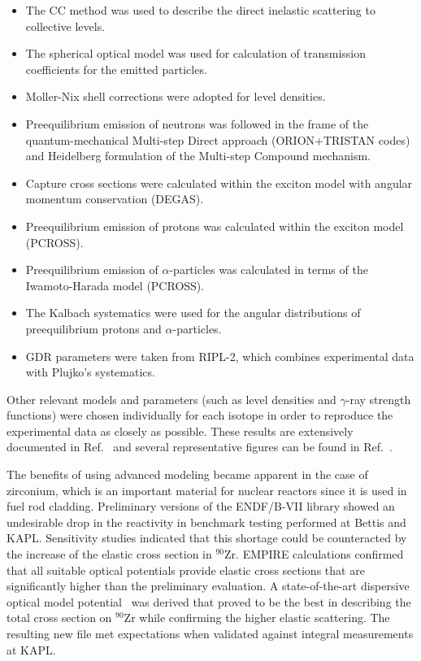\begin{itemize}
\item The CC method was used to describe the direct inelastic scattering to
collective levels.

\item The spherical optical model was used for calculation of transmission
coefficients for the emitted particles.

\item Moller-Nix shell corrections were adopted for level densities.

\item Preequilibrium emission of neutrons was followed in the frame of the
quantum-mechanical Multi-step Direct approach (ORION+TRISTAN codes) and
Heidelberg formulation of the Multi-step Compound mechanism.

\item Capture cross sections were calculated within the exciton model with
angular momentum conservation (DEGAS).

\item Preequilibrium emission of protons was calculated within the exciton
model (PCROSS).

\item Preequilibrium emission of $\alpha$-particles was calculated in terms
of the Iwamoto-Harada model (PCROSS).

\item The Kalbach systematics were used for the angular distributions of
preequilibrium protons and $\alpha$-particles.

\item GDR parameters were taken from RIPL-2, which combines experimental
data with Plujko's systematics.
\end{itemize}

\noindent Other relevant models and parameters (such as level densities and $%
\gamma$-ray strength functions) were chosen individually for each isotope in
order to reproduce the experimental data as closely as possible. These results
are extensively documented in Ref.~\cite{Kim:07} and several representative
figures can be found in Ref.~\cite{ENDF-VII}.

The benefits of using advanced modeling became apparent in the case of
zirconium, which is an important material for nuclear reactors since it is
used in fuel rod cladding. Preliminary versions of the ENDF/B-VII library
showed an undesirable drop in the reactivity in benchmark testing performed
at Bettis and KAPL. Sensitivity studies indicated that this shortage could
be counteracted by the increase of the elastic cross section in $^{90}$Zr.
EMPIRE calculations confirmed that all suitable optical potentials provide
elastic cross sections that are significantly higher than the preliminary
evaluation. A state-of-the-art dispersive optical model potential~\cite%
{Capote:06, Capote:05, Soukhovitskii:05} was derived that proved to be the
best in describing the total cross section on $^{90}$Zr while confirming the
higher elastic scattering. The resulting new file met expectations when
validated against integral measurements at KAPL.

